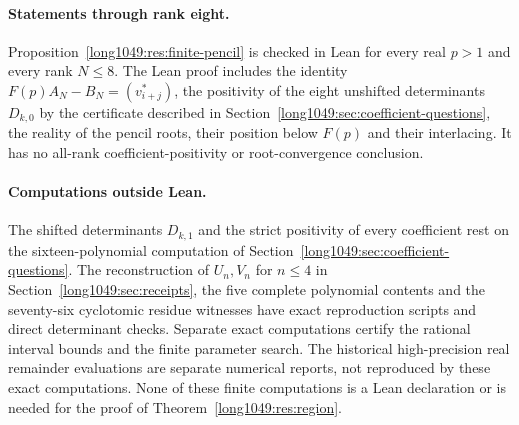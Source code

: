 \documentclass[11pt]{article}
\begin{document}
\paragraph{Statements through rank eight.}
Proposition~\ref{long1049:res:finite-pencil} is checked in Lean for
every real $p>1$ and every rank $N\le8$. The Lean proof includes the
identity $F(p)A_N-B_N=(v^*_{i+j})$, the positivity of the eight unshifted
determinants $D_{k,0}$ by the certificate described in
Section~\ref{long1049:sec:coefficient-questions}, the reality of the
pencil roots, their position below $F(p)$ and their interlacing. It has
no all-rank coefficient-positivity or root-convergence conclusion.

\paragraph{Computations outside Lean.}
The shifted determinants $D_{k,1}$ and the strict positivity of every
coefficient rest on the sixteen-polynomial computation of
Section~\ref{long1049:sec:coefficient-questions}. The reconstruction of
$U_n,V_n$ for $n\le4$ in Section~\ref{long1049:sec:receipts}, the five
complete polynomial contents and the seventy-six cyclotomic residue
witnesses have exact reproduction scripts and direct determinant checks.
Separate exact computations certify the rational interval bounds and the
finite parameter search. The historical high-precision real remainder
evaluations are separate numerical reports, not reproduced by these exact
computations. None of these finite computations is a Lean declaration or
is needed for the proof of Theorem~\ref{long1049:res:region}.
\end{document}
